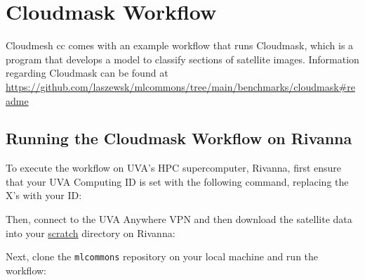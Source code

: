\hypertarget{cloudmask-workflow}{%
\section{Cloudmask Workflow}\label{cloudmask-workflow}}

Cloudmesh cc comes with an example workflow that runs Cloudmask, which
is a program that develops a model to classify sections of satellite
images. Information regarding Cloudmask can be found at
\url{https://github.com/laszewsk/mlcommons/tree/main/benchmarks/cloudmask\#readme}

\hypertarget{running-the-cloudmask-workflow-on-rivanna}{%
\subsection{Running the Cloudmask Workflow on
Rivanna}\label{running-the-cloudmask-workflow-on-rivanna}}

To execute the workflow on UVA's HPC supercomputer, Rivanna, first
ensure that your UVA Computing ID is set with the following command,
replacing the X's with your ID:

\begin{Shaded}
\begin{Highlighting}[]
\end{Highlighting}
\end{Shaded}

Then, connect to the UVA Anywhere VPN and then download the satellite
data into your
\href{https://www.rc.virginia.edu/userinfo/storage/non-sensitive-data/\#scratch}{scratch}
directory on Rivanna:

\begin{Shaded}
\begin{Highlighting}[]
\end{Highlighting}
\end{Shaded}

Next, clone the \texttt{mlcommons} repository on your local machine and
run the workflow:

